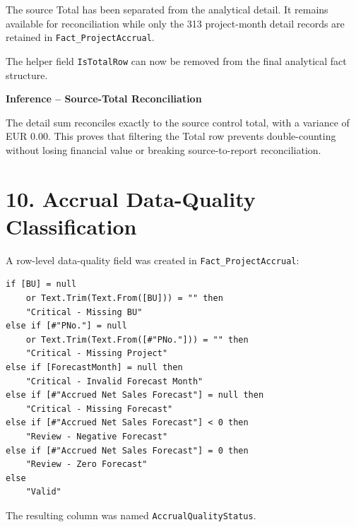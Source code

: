 \documentclass[11pt,a4paper]{article}
\begin{document}
\begin{successbox}

\textbf{\color{SuccessGreen}{Total-Row Control Result}}

The source Total has been separated from the analytical detail. It
remains available for reconciliation while only the 313 project-month
detail records are retained in \texttt{Fact\_ProjectAccrual}.

The helper field \texttt{IsTotalRow} can now be removed from the final
analytical fact structure.

\end{successbox}

\begin{inferencebox}

\textbf{Inference -- Source-Total Reconciliation}

The detail sum reconciles exactly to the source control total, with a variance
of EUR 0.00. This proves that filtering the Total row prevents double-counting
without losing financial value or breaking source-to-report reconciliation.

\end{inferencebox}


\section{10. Accrual Data-Quality Classification}

A row-level data-quality field was created in
\texttt{Fact\_ProjectAccrual}:

\begin{lstlisting}[style=powerquery]
if [BU] = null
    or Text.Trim(Text.From([BU])) = "" then
    "Critical - Missing BU"
else if [#"PNo."] = null
    or Text.Trim(Text.From([#"PNo."])) = "" then
    "Critical - Missing Project"
else if [ForecastMonth] = null then
    "Critical - Invalid Forecast Month"
else if [#"Accrued Net Sales Forecast"] = null then
    "Critical - Missing Forecast"
else if [#"Accrued Net Sales Forecast"] < 0 then
    "Review - Negative Forecast"
else if [#"Accrued Net Sales Forecast"] = 0 then
    "Review - Zero Forecast"
else
    "Valid"
\end{lstlisting}

The resulting column was named \texttt{AccrualQualityStatus}.
\end{document}
